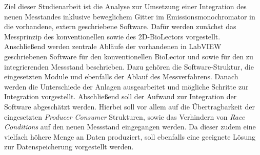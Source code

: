 Ziel dieser Studienarbeit ist die Analyse zur Umsetzung einer Integration des neuen Messtandes inklusive beweglichem Gitter im Emissionsmonochromator in die vorhandene, extern geschriebene Software. Dafür werden zunächst das Messprinzip des konventionellen sowie des 2D-BioLectors vorgestellt. Anschließend werden zentrale Abläufe der vorhandenen in LabVIEW geschriebenen Software für den konventionellen BioLector und sowie für den zu integrierenden Messstand beschrieben. Dazu gehören die Software-Struktur, die eingesetzten Module und ebenfalls der Ablauf des Messverfahrens. Danach werden die Unterschiede der Anlagen ausgearbeitet und mögliche Schritte zur Integration vorgestellt. Abschließend soll der Aufwand zur Integration der Software abgeschätzt werden. Hierbei soll vor allem auf die Übertragbarkeit der eingesetzten \textit{Producer Consumer} Strukturen, sowie das Verhindern von \textit{Race Conditions} auf den neuen Messstand eingegangen werden. Da dieser zudem eine vielfach höhere Menge an Daten produziert, soll ebenfalls eine geeignete Lösung zur Datenspeicherung vorgestellt werden.

